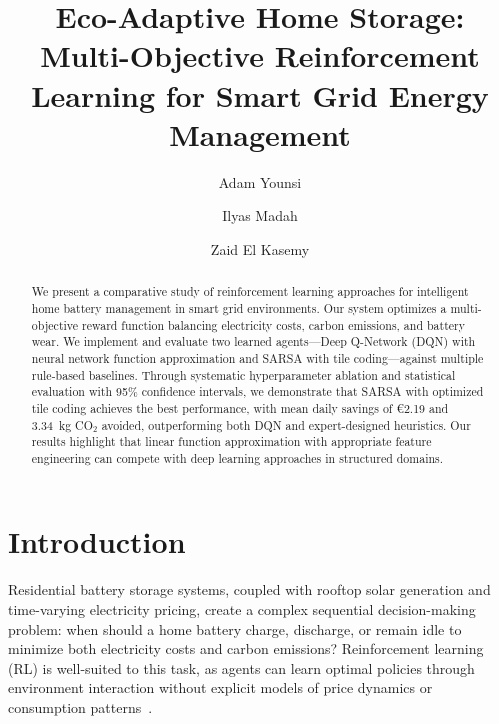 \documentclass[runningheads]{llncs}
\begin{document}
\title{Eco-Adaptive Home Storage: Multi-Objective Reinforcement Learning for Smart Grid Energy Management}


\author{Adam Younsi \and Ilyas Madah \and Zaid El Kasemy}



\maketitle

\begin{abstract}
We present a comparative study of reinforcement learning approaches for intelligent home battery management in smart grid environments. Our system optimizes a multi-objective reward function balancing electricity costs, carbon emissions, and battery wear. We implement and evaluate two learned agents---Deep Q-Network (DQN) with neural network function approximation and SARSA with tile coding---against multiple rule-based baselines. Through systematic hyperparameter ablation and statistical evaluation with 95\% confidence intervals, we demonstrate that SARSA with optimized tile coding achieves the best performance, with mean daily savings of \euro{}2.19 and 3.34~kg CO$_2$ avoided, outperforming both DQN and expert-designed heuristics. Our results highlight that linear function approximation with appropriate feature engineering can compete with deep learning approaches in structured domains.

\end{abstract}

\section{Introduction}

Residential battery storage systems, coupled with rooftop solar generation and time-varying electricity pricing, create a complex sequential decision-making problem: when should a home battery charge, discharge, or remain idle to minimize both electricity costs and carbon emissions? Reinforcement learning (RL) is well-suited to this task, as agents can learn optimal policies through environment interaction without explicit models of price dynamics or consumption patterns~\cite{vazquez2019rl,wang2020deep}.
\end{document}
